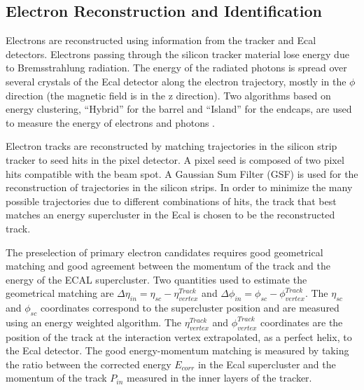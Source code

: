 \subsection{Electron Reconstruction and Identification}\label{eID}

Electrons are reconstructed using information from the  tracker and Ecal detectors. Electrons
passing through the  silicon tracker material lose energy due to Bremsstrahlung  radiation. The
energy of the radiated photons is spread  over several crystals of the Ecal detector along the 
electron trajectory, mostly in the $\phi$ direction  (the magnetic field is in the z direction).
Two algorithms  based on energy clustering, ``Hybrid'' for the barrel and  ``Island'' for the
endcaps, are used to measure the energy  of electrons and photons \cite{eRecoCMS}.

Electron tracks are reconstructed by matching trajectories  in the silicon strip tracker to seed
hits in the pixel  detector. A pixel seed is composed of two pixel hits  compatible with the beam
spot. A Gaussian Sum Filter (GSF)  is used for the reconstruction of trajectories in the  silicon
strips. In order to minimize the many possible  trajectories due to different combinations of hits,
the  track that best matches an energy supercluster in the Ecal  is chosen to be the reconstructed
track.

The preselection of primary electron candidates requires  good geometrical matching and good
agreement between the  momentum of the track and the energy of the ECAL  supercluster. Two
quantities used to estimate the geometrical matching are $\Delta \eta_{in} = \eta_{sc}
-\eta^{Track}_{vertex}$ and  $\Delta \phi_{in} = \phi_{sc} -\phi^{Track}_{vertex}$. The $\eta_{sc}$
and $\phi_{sc}$ coordinates correspond to  the supercluster position and are measured using an
energy weighted algorithm. The $\eta^{Track}_{vertex}$ and  $\phi^{Track}_{vertex}$ coordinates are
the position of the track at the interaction vertex extrapolated,  as a perfect helix, to the Ecal
detector. The good energy-momentum matching is measured by taking the ratio  between the corrected
energy $E_{corr}$ in the Ecal  supercluster and the momentum of the track $P_{in}$  measured in the
inner layers of the tracker.

